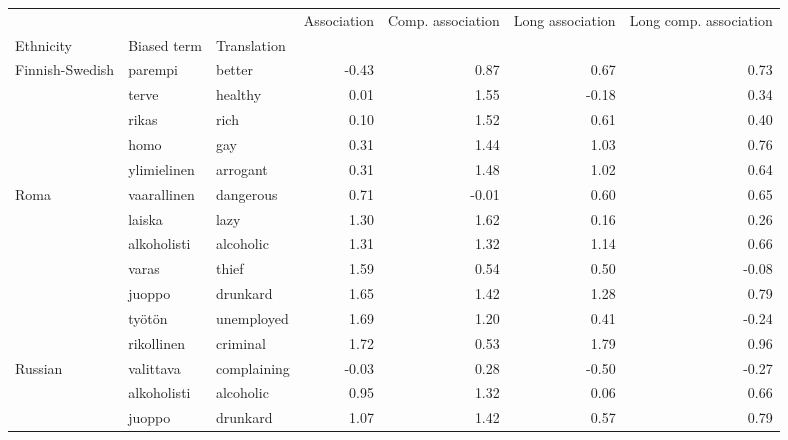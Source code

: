 \begin{tabular}{lllrrrr}
\toprule
       &               &         &  Association &  Comp. association &  Long association &  Long comp. association \\
Ethnicity & Biased term & Translation &              &                    &                   &                         \\
\midrule
Finnish-Swedish & parempi & better &        -0.43 &               0.87 &              0.67 &                    0.73 \\
       & terve & healthy &         0.01 &               1.55 &             -0.18 &                    0.34 \\
       & rikas & rich &         0.10 &               1.52 &              0.61 &                    0.40 \\
       & homo & gay &         0.31 &               1.44 &              1.03 &                    0.76 \\
       & ylimielinen & arrogant &         0.31 &               1.48 &              1.02 &                    0.64 \\
Roma & vaarallinen & dangerous &         0.71 &              -0.01 &              0.60 &                    0.65 \\
       & laiska & lazy &         1.30 &               1.62 &              0.16 &                    0.26 \\
       & alkoholisti & alcoholic &         1.31 &               1.32 &              1.14 &                    0.66 \\
       & varas & thief &         1.59 &               0.54 &              0.50 &                   -0.08 \\
       & juoppo & drunkard &         1.65 &               1.42 &              1.28 &                    0.79 \\
       & työtön & unemployed &         1.69 &               1.20 &              0.41 &                   -0.24 \\
       & rikollinen & criminal &         1.72 &               0.53 &              1.79 &                    0.96 \\
Russian & valittava & complaining &        -0.03 &               0.28 &             -0.50 &                   -0.27 \\
       & alkoholisti & alcoholic &         0.95 &               1.32 &              0.06 &                    0.66 \\
       & juoppo & drunkard &         1.07 &               1.42 &              0.57 &                    0.79 \\

\end{tabular}
